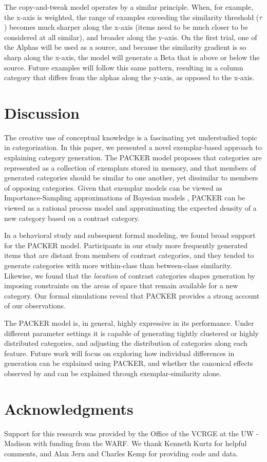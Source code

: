 \documentclass[10pt,letterpaper]{article}
\begin{document}
The copy-and-tweak model operates by a similar principle. When, for example, the x-axis is weighted, the range of examples exceeding the similarity threshold ($\tau$) becomes much sharper along the x-axis (items need to be much closer to be considered at all similar), and broader along the y-axis. On the first trial, one of the Alphas will be used as a source, and because the similarity gradient is so sharp along the x-axis, the model will generate a Beta that is above or below the source. Future examples will follow this same pattern, resulting in a column category that differs from the alphas along the y-axis, as opposed to the x-axis.

\section{Discussion}
The creative use of conceptual knowledge is a fascinating yet understudied topic in categorization. In this paper, we presented a novel exemplar-based approach to explaining category generation. The PACKER model proposes that categories are represented as a collection of exemplars stored in memory, and that members of generated categories should be similar to one another, yet dissimilar to members of opposing categories. Given that exemplar models can be viewed as Importance-Sampling approximations of Bayesian models \citep{shi10}, PACKER can be viewed as a rational process model and approximating the expected density of a new category based on a contrast category. 

In a behavioral study and subsequent formal modeling, we found broad support for the PACKER model. Participants in our study more frequently generated items that are distant from members of contrast categories, and they tended to generate categories with more within-class than between-class similarity. Likewise, we found that the \textit{location} of contrast categories shapes generation by imposing constraints on the areas of space that remain available for a new category. Our formal simulations reveal that PACKER provides a strong account of our observations.

The PACKER model is, in general, highly expressive in its performance. Under different parameter settings it is capable of generating tightly clustered or highly distributed categories, and adjusting the distribution of categories along each feature. Future work will focus on exploring how individual differences in generation can be explained using PACKER, and whether the canonical effects observed by \citet{ward1994structured} and \citet{jern2013probabilistic} can be explained through exemplar-similarity alone.

\section{Acknowledgments}
Support for this research was provided by the Office of the VCRGE at the UW - Madison with funding from the WARF. We thank Kenneth Kurtz for helpful comments, and Alan Jern and Charles Kemp for providing code and data.




\setlength{\bibleftmargin}{.025in}
\setlength{\bibindent}{-\bibleftmargin}

\end{document}
